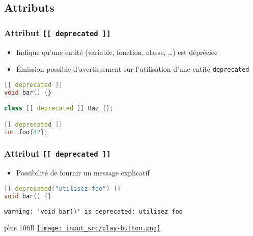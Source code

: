 \documentclass[C++.tex]{subfiles}
\begin{document}
\subsection*{Attributs}
\begin{frame}[fragile]
	\frametitle{Attribut \lstinline|[[ deprecated ]]|}
	\begin{itemize}
		\item Indique qu'une entité (variable, fonction, classe, \ldots{}) est dépréciée
		\item Émission possible d'avertissement sur l'utilisation d'une entité \lstinline|deprecated|

	\end{itemize}

	\begin{lstlisting}[language=C++]
[[ deprecated ]]
void bar() {}

class [[ deprecated ]] Baz {};

[[ deprecated ]]
int foo{42};\end{lstlisting}
\end{frame}

\begin{frame}[fragile]
	\frametitle{Attribut \lstinline|[[ deprecated ]]|}
	\begin{itemize}
		\item Possibilité de fournir un message explicatif
	\end{itemize}

	\begin{lstlisting}[language=C++]
[[ deprecated("utilisez foo") ]]
void bar() {}\end{lstlisting}

	\begin{lstlisting}
warning: 'void bar()' is deprecated: utilisez foo\end{lstlisting}

	\vskip 10mm plus 10fill
	\hfill
	\href{https://godbolt.org/#g:!((g:!((g:!((h:codeEditor,i:(filename:'1',fontScale:14,fontUsePx:'0',j:1,lang:c%2B%2B,selection:(endColumn:1,endLineNumber:22,positionColumn:1,positionLineNumber:22,selectionStartColumn:1,selectionStartLineNumber:1,startColumn:1,startLineNumber:1),source:'%23include+%3Ciostream%3E%0A%0A%5B%5B+deprecated(%22Utilisez+Foo%22)+%5D%5D%0Astatic+void+bar()%0A%7B%0A%7D%0A%0Aclass+%5B%5B+deprecated+%5D%5D+Baz%0A%7B%0A%7D%3B%0A%0Aint+main()%0A%7B%0A++bar()%3B%0A%0A++Baz+baz%3B%0A%0A++%5B%5B+deprecated+%5D%5D%0A++int+foo%7B42%7D%3B%0A++std::cout+%3C%3C+foo+%3C%3C+!'%5Cn!'%3B%0A%7D%0A'),l:'5',n:'0',o:'C%2B%2B+source+%231',t:'0')),k:50,l:'4',n:'0',o:'',s:0,t:'0'),(g:!((h:executor,i:(argsPanelShown:'1',compilationPanelShown:'0',compiler:g122,compilerName:'',compilerOutShown:'0',execArgs:'',execStdin:'',fontScale:14,fontUsePx:'0',j:1,lang:c%2B%2B,libs:!((name:boost,ver:'175')),options:'-std%3Dc%2B%2B14+-Wall+-Wextra',source:1,stdinPanelShown:'1',tree:'1',wrap:'0'),l:'5',n:'0',o:'Executor+x86-64+gcc+12.2+(C%2B%2B,+Editor+%231)',t:'0')),header:(),k:50,l:'4',n:'0',o:'',s:0,t:'0')),l:'2',n:'0',o:'',t:'0')),version:4}{\texttt{[image: input\_src/play-button.png]}}
\end{frame}
\end{document}
